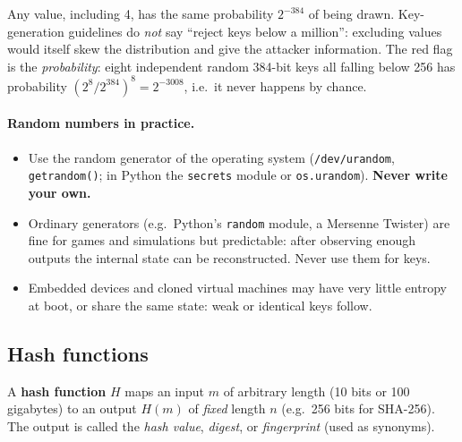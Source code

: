 \begin{remark}
Any value, including 4, has the same probability $2^{-384}$ of being drawn. Key-generation guidelines do \emph{not} say \enquote{reject keys below a million}: excluding values would itself skew the distribution and give the attacker information. The red flag is the \emph{probability}: eight independent random 384-bit keys all falling below 256 has probability $(2^8/2^{384})^8 = 2^{-3008}$, i.e.\ it never happens by chance.
\end{remark}

\paragraph{Random numbers in practice.}
\begin{itemize}
    \item Use the random generator of the operating system (\texttt{/dev/urandom}, \texttt{getrandom()}; in Python the \texttt{secrets} module or \texttt{os.urandom}). \textbf{Never write your own.}
    \item Ordinary generators (e.g.\ Python's \texttt{random} module, a Mersenne Twister) are fine for games and simulations but predictable: after observing enough outputs the internal state can be reconstructed. Never use them for keys.
    \item Embedded devices and cloned virtual machines may have very little entropy at boot, or share the same state: weak or identical keys follow.
\end{itemize}

\subsection{Hash functions}

\begin{definition}
A \textbf{hash function} $H$ maps an input $m$ of arbitrary length (10 bits or 100 gigabytes) to an output $H(m)$ of \emph{fixed} length $n$ (e.g.\ 256 bits for SHA-256). The output is called the \emph{hash value}, \emph{digest}, or \emph{fingerprint} (used as synonyms).
\end{definition}

